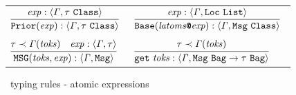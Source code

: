 \documentclass[final]{article}
\begin{document}
\begin{figure}[t]
\begin{small}
\begin{center}
\begin{tabular}{llll}
    \multicolumn{2}{l}{
      $\MEMinferb
      {\MEMtyping{\CONSprior{\METAexp}}{\METAityenv}{\CONSconsty{\METAity}{\CONSclassty}}}
      {\MEMtyping{\METAexp}{\METAityenv}{\CONSconsty{\METAity}{\CONSclassty}}}$
    }

    &

    \multicolumn{2}{l}{
      $\MEMinferb
      {\MEMtyping{\CONSbase{\METAatomsl}{\METAexp}}{\METAityenv}{\CONSconsty{\CONSmsgty}{\CONSclassty}}}
      {\MEMtyping{\METAexp}{\METAityenv}{\CONSconsty{\CONSlocty}{\CONSlistty}}}$
    }

    \\
    &&&
    \\

    \multicolumn{2}{l}{
      $\MEMinferc
      {\MEMtyping{\CONSmsg{\METAatoms}{\METAexp}}{\METAityenv}{\CONSmsgty}}
      {\MEMinstance{\METAity}{\MEMafunc{\METAityenv}{\METAatoms}}}
      {\MEMtyping{\METAexp}{\METAityenv}{\METAity}}$
    }

    &

    \multicolumn{2}{l}{
      $\MEMinferb
      {\MEMtyping{\CONSget{\METAatoms}}{\METAityenv}{\CONSarrowty{\CONSconsty{\CONSmsgty}{\CONSbagty}}{\CONSconsty{\METAity}{\CONSbagty}}}}
      {\MEMinstance{\METAity}{\MEMafunc{\METAityenv}{\METAatoms}}}$
    }
  \end{tabular}
\end{center}
\caption{\eml\ typing rules - atomic expressions}
\label{fig:typing-rules-atomic-expressions}
\end{small}
\end{figure}
\end{document}
